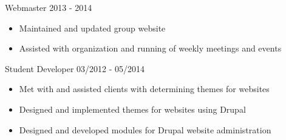 \documentclass[11pt]{article} %
\begin{document}
\begin{description}
           {Webmaster}
           {2013 - 2014}

\begin{itemize}
  \item Maintained and updated group website
  \item Assisted with organization and running of weekly meetings and events
\end{itemize}


           {Student Developer}
           {03/2012 - 05/2014}

\begin{itemize}
  \item Met with and assisted clients with determining themes for websites
  \item Designed and implemented themes for websites using Drupal 
  \item Designed and developed modules for Drupal website administration
\end{itemize}


\end{description}
\end{document}
